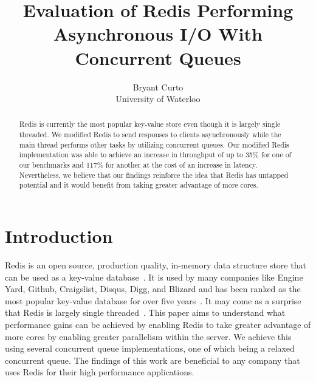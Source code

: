 \documentclass[sigconf, screen]{acmart}
\newcommand{\inlinecode}[1]{\texttt{#1}}
\begin{document}
\title{Evaluation of Redis Performing Asynchronous I/O With Concurrent Queues}

\author{Bryant Curto\\
University of Waterloo}

\begin{abstract}
Redis is currently the most popular key-value store even though it is largely single threaded.
We modified Redis to send responses to clients asynchronously while the main thread performs other tasks by utilizing concurrent queues.
Our modified Redis implementation was able to achieve an increase in throughput of up to 35\% for one of our benchmarks and 117\% for another at the cost of an increase in latency.
Nevertheless, we believe that our findings reinforce the idea that Redis has untapped potential and it would benefit from taking greater advantage of more cores.
\end{abstract}

\maketitle

\section{Introduction}
Redis is an open source, production quality, in-memory data structure store that can be used as a key-value database~\cite{redis-intro}.
It is used by many companies like Engine Yard, Github, Craigslist, Disqus, Digg, and Blizard and has been ranked as the most popular key-value database for over five years~\cite{macedo2011redis6,best-kv-store}.
It may come as a surprise that Redis is largely single threaded~\cite{redis-single-threaded}.
This paper aims to understand what performance gains can be achieved by enabling Redis to take greater advantage of more cores by enabling greater parallelism within the server.
We achieve this using several concurrent queue implementations, one of which being a relaxed concurrent queue.
The findings of this work are beneficial to any company that uses Redis for their high performance applications.
\end{document}
